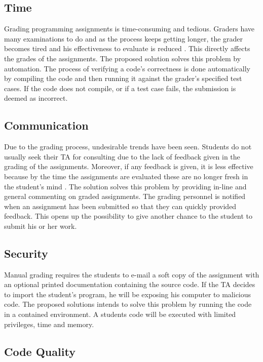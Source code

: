 \subsection*{Time}

Grading programming assignments is time-consuming and tedious. Graders have many
examinations to do and as the process keeps getting longer, the grader becomes
tired and his effectiveness to evaluate is reduced \cite{Cheang2003}. This
directly affects the grades of the assignments. The proposed solution solves
this problem by automation. The process of verifying a code's correctness is
done automatically by compiling the code and then running it against the
grader's specified test cases. If the code does not compile, or if a test case
fails, the submission is deemed as incorrect.

\subsection*{Communication}

Due to the grading process, undesirable trends have been seen. Students do not
usually seek their TA for consulting due to the lack of feedback given in the
grading of the assignments. Moreover, if any feedback is given, it is less
effective because by the time the assignments are evaluated these are no longer
fresh in the student's mind \cite{Cheang2003}. The solution solves this problem
by providing in-line and general commenting on graded assignments. The grading
personnel is notified when an assignment has been submitted so that they can
quickly provided feedback. This opens up the possibility to give another chance
to the student to submit his or her work.

\subsection*{Security}

Manual grading requires the students to e-mail a soft copy of the assignment
with an optional printed documentation containing the source code. If the TA
decides to import the student's program, he will be exposing his computer to
malicious code. The proposed solutions intends to solve this problem by running
the code in a contained environment. A students code will be executed with
limited privileges, time and memory.

\subsection*{Code Quality}

